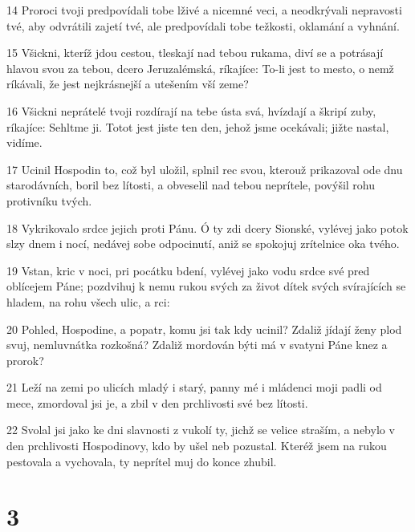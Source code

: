 \par 14 Proroci tvoji predpovídali tobe lživé a nicemné veci, a neodkrývali nepravosti tvé, aby odvrátili zajetí tvé, ale predpovídali tobe težkosti, oklamání a vyhnání.
\par 15 Všickni, kteríž jdou cestou, tleskají nad tebou rukama, diví se a potrásají hlavou svou za tebou, dcero Jeruzalémská, ríkajíce: To-li jest to mesto, o nemž ríkávali, že jest nejkrásnejší a utešením vší zeme?
\par 16 Všickni neprátelé tvoji rozdírají na tebe ústa svá, hvízdají a škripí zuby, ríkajíce: Sehltme ji. Totot jest jiste ten den, jehož jsme ocekávali; jižte nastal, vidíme.
\par 17 Ucinil Hospodin to, což byl uložil, splnil rec svou, kterouž prikazoval ode dnu starodávních, boril bez lítosti, a obveselil nad tebou neprítele, povýšil rohu protivníku tvých.
\par 18 Vykrikovalo srdce jejich proti Pánu. Ó ty zdi dcery Sionské, vylévej jako potok slzy dnem i nocí, nedávej sobe odpocinutí, aniž se spokojuj zrítelnice oka tvého.
\par 19 Vstan, kric v noci, pri pocátku bdení, vylévej jako vodu srdce své pred oblícejem Páne; pozdvihuj k nemu rukou svých za život dítek svých svírajících se hladem, na rohu všech ulic, a rci:
\par 20 Pohled, Hospodine, a popatr, komu jsi tak kdy ucinil? Zdaliž jídají ženy plod svuj, nemluvnátka rozkošná? Zdaliž mordován býti má v svatyni Páne knez a prorok?
\par 21 Leží na zemi po ulicích mladý i starý, panny mé i mládenci moji padli od mece, zmordoval jsi je, a zbil v den prchlivosti své bez lítosti.
\par 22 Svolal jsi jako ke dni slavnosti z vukolí ty, jichž se velice straším, a nebylo v den prchlivosti Hospodinovy, kdo by ušel neb pozustal. Kteréž jsem na rukou pestovala a vychovala, ty neprítel muj do konce zhubil.

\chapter{3}

